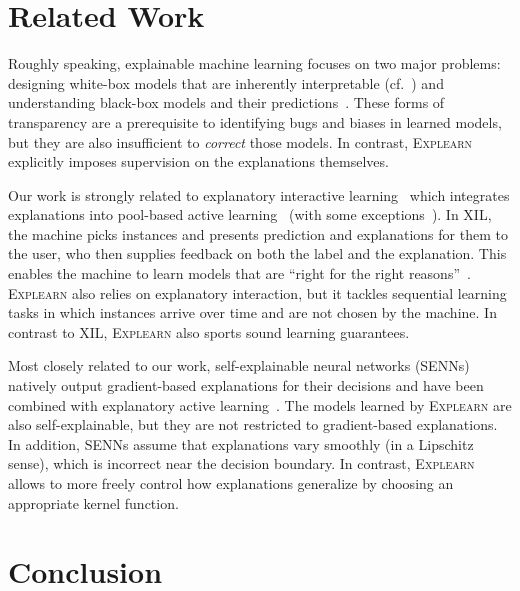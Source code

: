\documentclass[letterpaper]{article} %
\newcommand{\explearn}{\textsc{Explearn}\xspace}
\begin{document}
\section{Related Work}\label{sec:related-work}

Roughly speaking, explainable machine learning focuses on two major problems:  designing white-box models that are inherently interpretable (cf.~\cite{lakkaraju2016interpretable}) and understanding black-box models and their predictions~\cite{craven1996extracting,guidotti2018local}.  These forms of transparency are a prerequisite to identifying bugs and biases in learned models, but they are also insufficient to \emph{correct} those models.  In contrast, \explearn explicitly imposes supervision on the explanations themselves.

Our work is strongly related to explanatory interactive learning~\cite{teso2019explanatory,schramowski2020right,lertvittayakumjorn2020find} which integrates explanations into pool-based active learning~\cite{settles2009active} (with some exceptions~\cite{popordanoska2020machine}).  In XIL, the machine picks instances and presents prediction and explanations for them to the user, who then supplies feedback on both the label and the explanation.  This enables the machine to learn models that are ``right for the right reasons''~\cite{ross2017right}.  \explearn also relies on explanatory interaction, but it tackles sequential learning tasks in which instances arrive over time and are not chosen by the machine.  In contrast to XIL, \explearn also sports sound learning guarantees.

Most closely related to our work, self-explainable neural networks (SENNs)~\cite{alvarez2018towards} natively output gradient-based explanations for their decisions and have been combined with explanatory active learning~\cite{teso2019toward}.  The models learned by \explearn are also self-explainable, but they are not restricted to gradient-based explanations.  In addition, SENNs assume that explanations vary smoothly (in a Lipschitz sense), which is incorrect near the decision boundary.  In contrast, \explearn allows to more freely control how explanations generalize by choosing an appropriate kernel function.


\section{Conclusion}\label{sec:conclusion}
\end{document}

